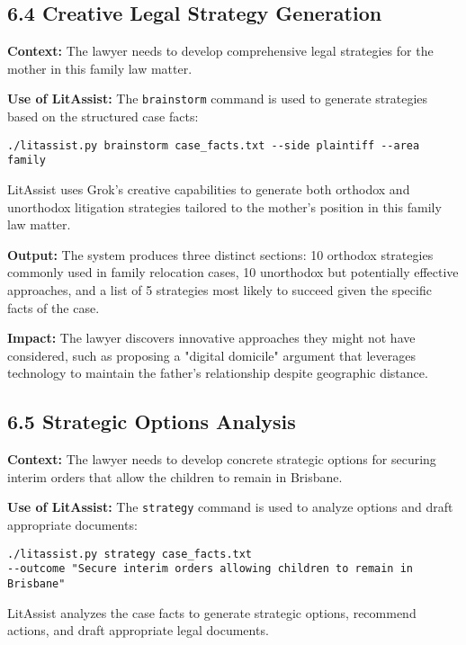 \documentclass[12pt,a4paper]{article}
\begin{document}
\subsection*{6.4 Creative Legal Strategy Generation}

\textbf{Context:} The lawyer needs to develop comprehensive legal strategies for the mother in this family law matter.

\textbf{Use of LitAssist:} The \texttt{brainstorm} command is used to generate strategies based on the structured case facts:

\begin{verbatim}
./litassist.py brainstorm case_facts.txt --side plaintiff --area family
\end{verbatim}

LitAssist uses Grok's creative capabilities to generate both orthodox and unorthodox litigation strategies tailored to the mother's position in this family law matter.

\textbf{Output:} The system produces three distinct sections: 10 orthodox strategies commonly used in family relocation cases, 10 unorthodox but potentially effective approaches, and a list of 5 strategies most likely to succeed given the specific facts of the case.

\textbf{Impact:} The lawyer discovers innovative approaches they might not have considered, such as proposing a "digital domicile" argument that leverages technology to maintain the father's relationship despite geographic distance.

\subsection*{6.5 Strategic Options Analysis}

\textbf{Context:} The lawyer needs to develop concrete strategic options for securing interim orders that allow the children to remain in Brisbane.

\textbf{Use of LitAssist:} The \texttt{strategy} command is used to analyze options and draft appropriate documents:

\begin{verbatim}
./litassist.py strategy case_facts.txt 
--outcome "Secure interim orders allowing children to remain in Brisbane"
\end{verbatim}

LitAssist analyzes the case facts to generate strategic options, recommend actions, and draft appropriate legal documents.
\end{document}
